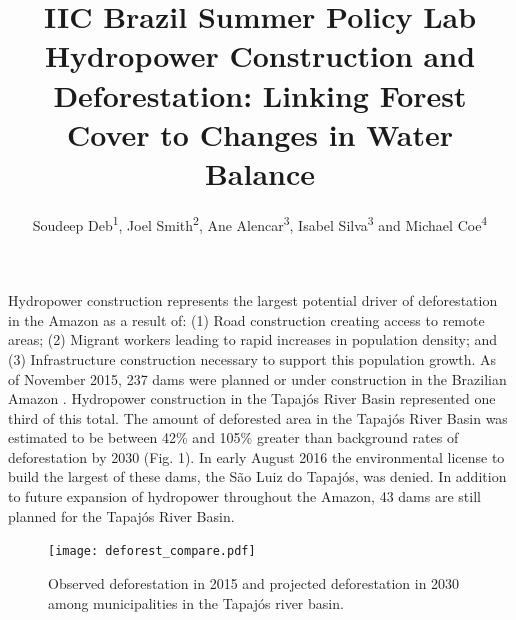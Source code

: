 \documentclass[DIV=calc, paper=a4, fontsize=11pt, twocolumn]{scrartcl}	 %
\title{{\color{black}IIC Brazil Summer Policy Lab}\\ \vspace{.3cm}Hydropower Construction and Deforestation: Linking Forest Cover to Changes in Water Balance} %
\author{Soudeep Deb\textsuperscript{1}, Joel Smith\textsuperscript{2}, Ane Alencar\textsuperscript{3}, Isabel Silva\textsuperscript{3} and Michael Coe\textsuperscript{4}\\} %
\date{} %
\newcommand{\initial}[1]{ %
\lettrine[lines=3,lhang=0.3,nindent=0em]{
\color{DarkGoldenrod}
{\textsf{#1}}}{}}
\begin{document}
\maketitle %
\thispagestyle{fancy} %
\initial{H}ydropower construction represents the largest potential driver of deforestation in the Amazon as a result of: (1) Road construction creating access to remote areas; (2) Migrant workers leading to rapid increases in population density; and (3) Infrastructure construction necessary to support this population growth. As of November 2015, 237 dams were planned or under construction in the Brazilian Amazon \cite{castello2015large}. Hydropower construction in the Tapaj\'{o}s River Basin represented one third of this total. The amount of deforested area in the Tapaj\'{o}s River Basin was estimated to be between 42\% and 105\% greater than background rates of deforestation by 2030 (Fig. 1). In early August 2016 the environmental license to build the largest of these dams, the S\~{a}o Luiz do Tapaj\'{o}s, was denied. In addition to future expansion of hydropower throughout the Amazon, 43 dams are still planned for the Tapaj\'{o}s River Basin.

\begin{figure}
  \centering
  \texttt{[image: deforest\_compare.pdf]}
 \caption{Observed deforestation in 2015 and projected deforestation in 2030 among municipalities in the Tapaj\'{o}s river basin.}
  \label{fig:deforest}
\end{figure}


\end{document}
